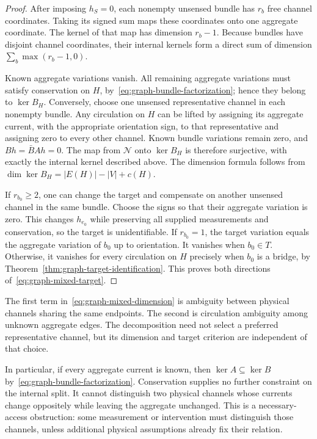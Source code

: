 \begin{proof}
After imposing $h_S=0$, each nonempty unsensed bundle has $r_b$ free channel
coordinates. Taking its signed sum maps these coordinates onto one aggregate
coordinate. The kernel of that map has dimension $r_b-1$. Because bundles have
disjoint channel coordinates, their internal kernels form a direct sum of
dimension $\sum_b\max(r_b-1,0)$.

Known aggregate variations vanish. All remaining aggregate variations must
satisfy conservation on $H$, by~\eqref{eq:graph-bundle-factorization}; hence
they belong to $\ker B_H$. Conversely, choose one unsensed representative
channel in each nonempty bundle. Any circulation on $H$ can be lifted by
assigning its aggregate current, with the appropriate orientation sign, to
that representative and assigning zero to every other channel. Known bundle
variations remain zero, and $Bh=\bar BAh=0$. The map from $\mathcal N$ onto
$\ker B_H$ is therefore surjective, with exactly the internal kernel described
above. The dimension formula follows from
$\dim\ker B_H=|E(H)|-|V|+c(H)$.

If $r_{b_0}\geq2$, one can change the target and compensate on another
unsensed channel in the same bundle. Choose the signs so that their aggregate
variation is zero. This changes $h_{e_0}$ while preserving all supplied
measurements and conservation, so the target is unidentifiable. If
$r_{b_0}=1$, the target variation equals the aggregate variation of $b_0$ up
to orientation. It vanishes when $b_0\in T$. Otherwise, it vanishes for every
circulation on $H$ precisely when $b_0$ is a bridge, by
Theorem~\ref{thm:graph-target-identification}. This proves both directions
of~\eqref{eq:graph-mixed-target}.
\end{proof}

The first term in~\eqref{eq:graph-mixed-dimension} is ambiguity between
physical channels sharing the same endpoints. The second is circulation
ambiguity among unknown aggregate edges. The decomposition need not select a
preferred representative channel, but its dimension and target criterion are
independent of that choice.

In particular, if every aggregate current is known, then $\ker A\subseteq\ker
B$ by~\eqref{eq:graph-bundle-factorization}. Conservation supplies no further
constraint on the internal split. It cannot distinguish two physical channels
whose currents change oppositely while leaving the aggregate unchanged. This
is a necessary-access obstruction: some measurement or intervention must
distinguish those channels, unless additional physical assumptions already
fix their relation.

